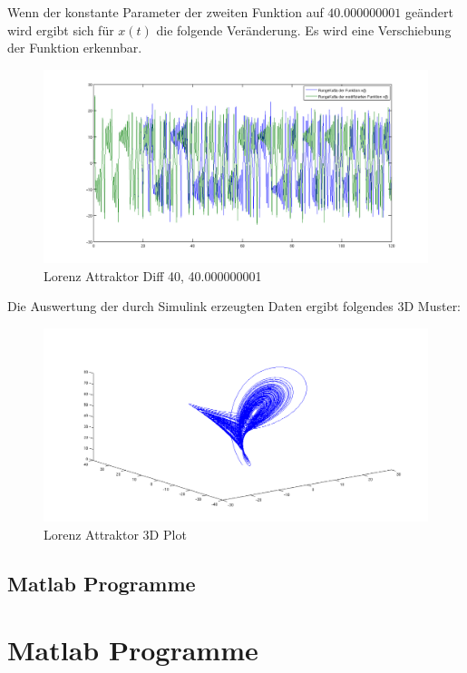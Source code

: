 \documentclass[10pt]{scrartcl}
\begin{document}
		Wenn der konstante Parameter der zweiten Funktion auf $40.000000001$ geändert wird ergibt sich für $x(t)$ die folgende Veränderung. Es wird eine Verschiebung der Funktion erkennbar.  
		
		\begin{figure}[H]
			\centering	
			\includegraphics[width=\textwidth]{lorenzdif.png}
            \caption{Lorenz Attraktor Diff 40, 40.000000001}
            \label{pic:diff}
		\end{figure} 
		
		Die Auswertung der durch Simulink erzeugten Daten ergibt folgendes 3D Muster:
		\begin{figure}[H]
			\centering	
			\includegraphics[width=\textwidth]{lorenz3d.png}
            \caption{Lorenz Attraktor 3D Plot}
            \label{pic:3dplot}
		\end{figure} 
		
\subsection{Matlab Programme}
	
			
			
		
		
	\section{Matlab Programme}	 \label{sec:matlab}
	
		
			
		
\end{document}
